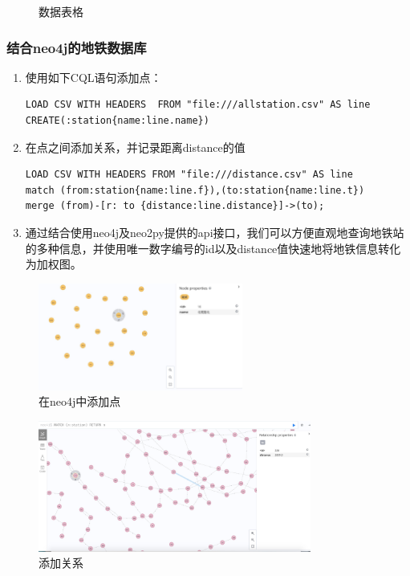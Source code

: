 \documentclass[12pt]{article}
\begin{document}
\begin{figure}[h]
{\begin{minipage}{0.4\linewidth}
		\end{minipage}
	}
	\caption{数据表格}
	\label{label}	
\end{figure}

\subsubsection{结合neo4j的地铁数据库}
\begin{enumerate}
\renewcommand{\labelenumi}{(\theenumi)}
\item 使用如下CQL语句添加点：
\begin{lstlisting}
LOAD CSV WITH HEADERS  FROM "file:///allstation.csv" AS line
CREATE(:station{name:line.name})
\end{lstlisting}
\item 在点之间添加关系，并记录距离distance的值
\begin{lstlisting}
LOAD CSV WITH HEADERS FROM "file:///distance.csv" AS line
match (from:station{name:line.f}),(to:station{name:line.t})
merge (from)-[r: to {distance:line.distance}]->(to);
\end{lstlisting}
\item 通过结合使用neo4j及neo2py提供的api接口，我们可以方便直观地查询地铁站的多种信息，并使用唯一数字编号的id以及distance值快速地将地铁信息转化为加权图。
\end{enumerate}
\begin{figure}[h]
    \centering
    \includegraphics[width = 0.6\textwidth]{assets/neo4j-nodes.jpg}
    \caption{\label{fig neo4j-nodes.jpg}在neo4j中添加点}
\end{figure}
\begin{figure}[h]
    \centering
    \includegraphics[width = 0.8\textwidth]{assets/neo4j-relationship.jpg}
    \caption{\label{fig neo4j-relationship.jpg}添加关系}
\end{figure}
~\
\end{document}
